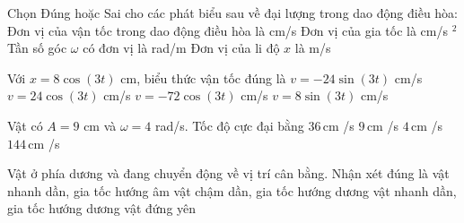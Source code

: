 \begin{ex}
Chọn Đúng hoặc Sai cho các phát biểu sau về đại lượng trong dao động điều hòa:
\choiceTF
{\True Đơn vị của vận tốc trong dao động điều hòa là cm/s}
{\True Đơn vị của gia tốc là cm/s $^2$}
{Tần số góc $\omega$ có đơn vị là rad/m}
{Đơn vị của li độ $x$ là m/s}
\end{ex}

\begin{ex}
Với $x=8\cos(3t)$ cm, biểu thức vận tốc đúng là
\choice
{\True $v=-24\sin(3t)$ cm/s}
{$v=24\cos(3t)$ cm/s}
{$v=-72\cos(3t)$ cm/s}
{$v=8\sin(3t)$ cm/s}
\end{ex}

\begin{ex}
Vật có $A=9$ cm và $\omega=4$ rad/s. Tốc độ cực đại bằng
\choice
{\True $36\,\text{cm}$ /s}
{$9\,\text{cm}$ /s}
{$4\,\text{cm}$ /s}
{$144\,\text{cm}$ /s}
\end{ex}

\begin{ex}
Vật ở phía dương và đang chuyển động về vị trí cân bằng. Nhận xét đúng là
\choice
{\True vật nhanh dần, gia tốc hướng âm}
{vật chậm dần, gia tốc hướng dương}
{vật nhanh dần, gia tốc hướng dương}
{vật đứng yên}
\end{ex}
